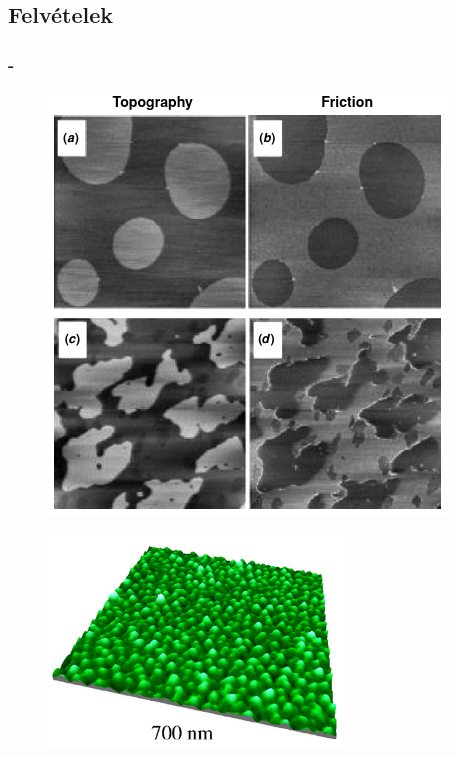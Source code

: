 \documentclass[aspectratio=169]{beamer}
\newcommand{\framet}{\frametitle{\secname{} - \subsecname}}
\begin{document}
\subsection{Felvételek}
\begin{frame}
\framet
\begin{minipage}[m]{.49\linewidth}
\begin{figure}
\includegraphics[width=.8\textwidth]{afm_kep1.png}
\end{figure}
\end{minipage}
\begin{minipage}[m]{.49\linewidth}
\begin{figure}
\includegraphics[width=\textwidth]{afm_kep2.png}
\end{figure}
\end{minipage}
\end{frame}
\end{document}
